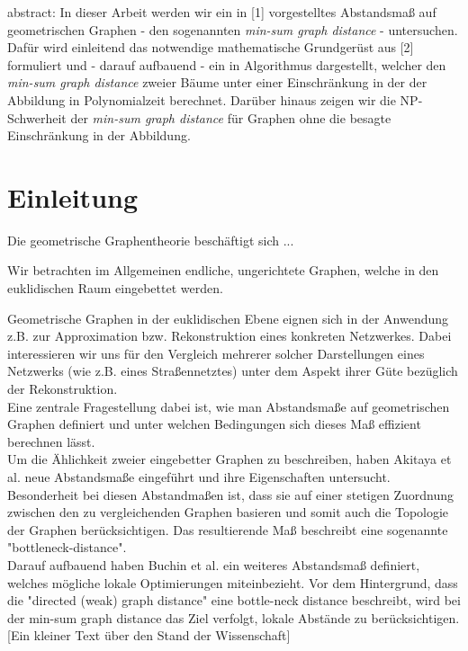 \documentclass[a4paper, 12pt, twoside]{article}
\theoremstyle{Format1} %
\begin{document}
\newpage
abstract:
In dieser Arbeit werden wir ein in [1] vorgestelltes Abstandsmaß auf geometrischen Graphen - den sogenannten \textit{min-sum graph distance} - untersuchen.
Dafür wird einleitend das notwendige mathematische Grundgerüst aus [2] formuliert und - darauf aufbauend - ein in Algorithmus
dargestellt, welcher den \textit{min-sum graph distance} zweier Bäume unter einer Einschränkung in der der Abbildung in Polynomialzeit berechnet.
Darüber hinaus zeigen wir die NP-Schwerheit der \textit{min-sum graph distance} für Graphen ohne die besagte Einschränkung in der Abbildung.


\newpage
\tableofcontents
\newpage\null\thispagestyle{empty}\newpage %
\section{Einleitung}

Die geometrische Graphentheorie beschäftigt sich ...

Wir betrachten im Allgemeinen endliche, ungerichtete Graphen, welche in den euklidischen Raum eingebettet werden.

Geometrische Graphen in der euklidischen Ebene eignen sich in der Anwendung z.B. zur Approximation bzw. Rekonstruktion eines konkreten Netzwerkes.
Dabei interessieren wir uns für den Vergleich mehrerer solcher Darstellungen eines Netzwerks (wie z.B. eines Straßennetztes) unter dem Aspekt ihrer Güte bezüglich der Rekonstruktion.
\\
Eine zentrale Fragestellung dabei ist, wie man Abstandsmaße auf geometrischen Graphen definiert und unter welchen Bedingungen sich dieses Maß effizient berechnen lässt.
\\
Um die Ählichkeit zweier eingebetter Graphen zu beschreiben, haben Akitaya et al. \cite{Akitaya} neue Abstandsmaße eingeführt und ihre Eigenschaften untersucht.
\\
Besonderheit bei diesen Abstandmaßen ist, dass sie auf einer stetigen Zuordnung zwischen den zu vergleichenden Graphen basieren und somit auch die Topologie der Graphen berücksichtigen.
Das resultierende Maß beschreibt eine sogenannte "bottleneck-distance".
\\
Darauf aufbauend haben \cite{Buchin} Buchin et al. ein weiteres Abstandsmaß definiert, welches mögliche lokale Optimierungen miteinbezieht.
Vor dem Hintergrund, dass die "directed (weak) graph distance" eine bottle-neck distance beschreibt, wird bei der min-sum graph distance das Ziel verfolgt, lokale Abstände zu berücksichtigen.
[Ein kleiner Text über den Stand der Wissenschaft]
\end{document}
